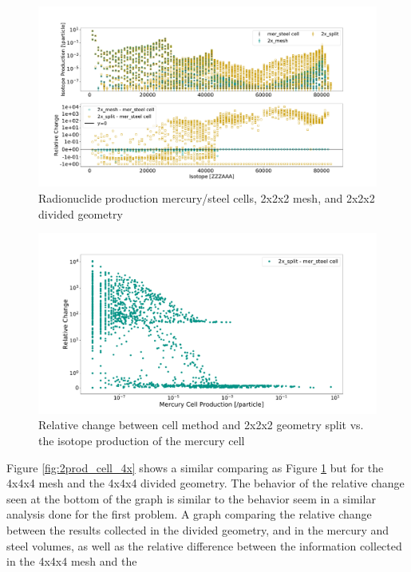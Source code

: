 %
\begin{figure}[H]
 \centering
 \includegraphics[scale=0.4,trim={2cm 1cm 3cm 2cm},clip]{../figs/toy_p2/prod_VPII_2x.pdf}
 \caption{Radionuclide production mercury/steel cells, 2x2x2 mesh, and 2x2x2 divided geometry}
 \label{fig:2prod_cell_2x}
\end{figure}
%
\begin{figure}[H]
 \centering
 \includegraphics[scale=0.35,trim={3cm 0.5cm 4.5cm 3cm},clip]{../figs/toy_p2/prod_VPII_rc_2x_split.pdf}
 \caption{Relative change between cell method and 2x2x2 geometry split vs. the isotope production of the mercury cell}
 \label{fig:2prod_cell_2x_rc}
\end{figure}
%
Figure \ref{fig:2prod_cell_4x} shows a similar comparing as Figure
\ref{fig:2prod_cell_2x} but for the 4x4x4 mesh and the 4x4x4 divided geometry.
The behavior of the relative change seen at the bottom of the graph is similar
to the behavior seem in a similar analysis done for the first problem.
A graph comparing the relative change between the results collected in the
divided geometry, and in the mercury and steel volumes, as well as the relative
difference between the information collected in the 4x4x4 mesh and the
